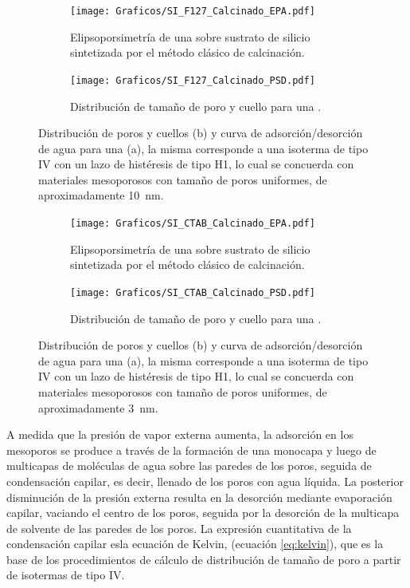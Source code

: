 		     	  	\begin{figure}[!ht]
		     	  		\begin{subfigure}[t]{0.495\textwidth}
		     	  		\texttt{[image: Graficos/SI\_F127\_Calcinado\_EPA.pdf]}
						\caption[Elipsoporsimetría \pdmF\space calcianda.]{Elipsoporsimetría de una \pdmF\space sobre sustrato de silicio sintetizada por el método clásico de calcinación.}
						\label{fig:F127_EPA}
						\end{subfigure}
						\begin{subfigure}[t]{0.495\textwidth}
		     	  		\texttt{[image: Graficos/SI\_F127\_Calcinado\_PSD.pdf]}
						\caption[Distribución \pdmF.]{Distribución de tamaño de poro y cuello para una \pdmF\space.}
						\label{fig:F127_PSD}
						\end{subfigure}
						\caption[Elipsoporosimetría para sistemas \pdmF.]{Distribución de poros y cuellos (b) y curva de adsorción/desorción de agua para una \pdmF (a), la misma corresponde a una isoterma de tipo IV con un lazo de histéresis de tipo H1, lo cual se concuerda con materiales mesoporosos con tamaño de poros uniformes, de aproximadamente \SI{10}{\nm}.}
						\end{figure}
					\begin{figure}[!ht]
		     	  		\begin{subfigure}[t]{0.495\textwidth}
		     	  		\texttt{[image: Graficos/SI\_CTAB\_Calcinado\_EPA.pdf]}
						\caption[Elipsoporsimetría \pdmF\space calcianda.]{Elipsoporsimetría de una \pdmF\space sobre sustrato de silicio sintetizada por el método clásico de calcinación.}
						\label{fig:CTAB_EPA}
						\end{subfigure}
						\begin{subfigure}[t]{0.495\textwidth}
		     	  		\texttt{[image: Graficos/SI\_CTAB\_Calcinado\_PSD.pdf]}
						\caption[Distribución \pdmC.]{Distribución de tamaño de poro y cuello para una \pdmC\space.}
						\label{fig:CTAB_PSD}
						\end{subfigure}
						\caption[Elipsoporosimetría para sistemas \pdmC.]{Distribución de poros y cuellos (b) y curva de adsorción/desorción de agua para una \pdmC (a), la misma corresponde a una isoterma de tipo IV con un lazo de histéresis de tipo H1, lo cual se concuerda con materiales mesoporosos con tamaño de poros uniformes, de aproximadamente \SI{3}{\nm}.}
						\end{figure}	
		
		A medida que la presión de vapor externa aumenta, la adsorción en los mesoporos se produce a través de la formación de una monocapa y luego de multicapas de moléculas de agua sobre las paredes de los poros, seguida de condensación capilar, es decir, llenado de los poros con agua líquida. La posterior disminución de la presión externa resulta en la desorción mediante evaporación capilar, vaciando el centro de los poros, seguida por la desorción de la multicapa	de solvente de las paredes de los poros. La expresión cuantitativa de la condensación capilar esla ecuación de Kelvin, (ecuación \ref{eq:kelvin}), que es la base de los procedimientos de cálculo de distribución de tamaño de poro a partir de isotermas de tipo IV.\cite{Baklanov2000}
		
